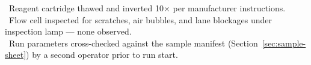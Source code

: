 \begin{infobox}
\faCheckCircle\ Reagent cartridge thawed and inverted 10$\times$ per manufacturer instructions.\\
\faCheckCircle\ Flow cell inspected for scratches, air bubbles, and lane blockages under
inspection lamp — none observed.\\
\faCheckCircle\ Run parameters cross-checked against the sample manifest (Section~\ref{sec:sample-sheet})
by a second operator prior to run start.
\end{infobox}
